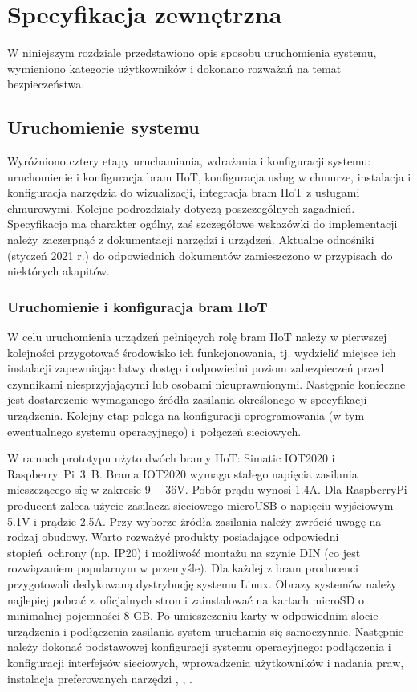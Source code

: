 \documentclass[a4paper, 12pt, twoside]{article}
\begin{document}
\section{Specyfikacja zewnętrzna}\label{spec-zew}

W niniejszym rozdziale przedstawiono opis sposobu uruchomienia systemu,
wymieniono kategorie użytkowników i dokonano rozważań na temat bezpieczeństwa.

\subsection{Uruchomienie systemu}

Wyróżniono cztery etapy uruchamiania, wdrażania i konfiguracji systemu:
uruchomienie i konfiguracja bram IIoT, konfiguracja usług w chmurze,
instalacja i konfiguracja narzędzia do wizualizacji, integracja bram
IIoT z usługami chmurowymi. Kolejne podrozdziały dotyczą poszczególnych zagadnień.
Specyfikacja ma charakter ogólny, zaś szczegółowe wskazówki do implementacji
należy zaczerpnąć z dokumentacji narzędzi i urządzeń. Aktualne
odnośniki (styczeń 2021 r.) do odpowiednich
dokumentów zamieszczono w przypisach do niektórych akapitów.

\subsubsection{Uruchomienie i konfiguracja bram IIoT}

W celu uruchomienia urządzeń pełniących rolę bram IIoT należy w pierwszej
kolejności przygotować środowisko ich funkcjonowania, tj. wydzielić
miejsce ich instalacji zapewniając łatwy dostęp i odpowiedni poziom zabezpieczeń
przed czynnikami niesprzyjającymi lub osobami nieuprawnionymi. Następnie
konieczne jest dostarczenie wymaganego źródła zasilania określonego
w specyfikacji urządzenia. Kolejny etap polega na konfiguracji oprogramowania
(w tym ewentualnego systemu operacyjnego) i~połączeń sieciowych.

W ramach prototypu użyto dwóch bramy IIoT: Simatic IOT2020 i Raspberry~Pi~3~B.
Brama IOT2020 wymaga stałego napięcia zasilania mieszczącego się w zakresie 9~-~36V.
Pobór prądu wynosi 1.4A. Dla RaspberryPi producent zaleca użycie
zasilacza sieciowego microUSB o napięciu wyjściowym 5.1V i prądzie 2.5A.
Przy wyborze źródła zasilania należy zwrócić uwagę na rodzaj obudowy. Warto
rozważyć produkty posiadające odpowiedni stopień ochrony (np. IP20) i możliwość
montażu na szynie DIN (co jest rozwiązaniem popularnym w przemyśle).
Dla każdej z bram producenci przygotowali dedykowaną dystrybucję systemu Linux.
Obrazy systemów należy najlepiej pobrać z~oficjalnych stron i zainstalować na kartach
microSD o minimalnej pojemności 8 GB. Po umieszczeniu karty w odpowiednim
slocie urządzenia i podłączenia zasilania system uruchamia się samoczynnie.
Następnie należy dokonać podstawowej konfiguracji systemu operacyjnego: podłączenia i konfiguracji interfejsów sieciowych,
wprowadzenia użytkowników i nadania praw, instalacja preferowanych narzędzi
\cite{simatic-iot-getting-started}, \cite{simatic-iot-sepc}, \cite{rpi-doc}.
\end{document}
